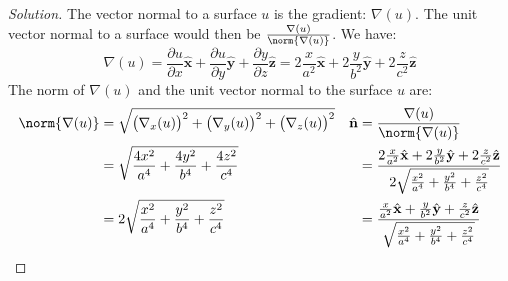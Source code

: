 \documentclass[crop=false,class=book,oneside]{standalone}
\begin{document}
            \begin{proof}[Solution]
                The vector normal to a surface $u$
                is the gradient: $\nabla(u)$.
                The unit vector normal to a surface would then be
                $\frac{\nabla(u)}{\norm{\nabla(u)}}$. We have:
                \begin{equation*}
                    \nabla(u)
                    =\frac{\partial u}{\partial x}\hat{\mathbf{x}}
                    +\frac{\partial u}{\partial y}\hat{\mathbf{y}}
                    +\frac{\partial y}{\partial z}\hat{\mathbf{z}}
                    =2\frac{x}{a^2}\hat{\mathbf{x}}
                    +2\frac{y}{b^2}\hat{\mathbf{y}}
                    +2\frac{z}{c^2}\hat{\mathbf{z}}
                \end{equation*}
                The norm of $\nabla(u)$ and the
                unit vector normal to the surface $u$ are:
                \begin{align*}
                    \norm{\nabla(u)}
                    &=
                    \sqrt{\big(\nabla_{x}(u)\big)^{2}
                    +\big(\nabla_{y}(u)\big)^{2}
                    +\big(\nabla_{z}(u)\big)^{2}}
                    &\hat{\mathbf{n}}
                    &=\frac{\nabla(u)}{\norm{\nabla(u)}}\\
                    &=
                    \sqrt{\frac{4x^{2}}{a^{4}}
                    +\frac{4y^{2}}{b^{4}}+\frac{4z^{2}}{c^{4}}}
                    &
                    &=\frac{2\frac{x}{a^{2}}\hat{\mathbf{x}}
                            +2\frac{y}{b^{2}}\hat{\mathbf{y}}
                            +2\frac{z}{c^{2}}\hat{\mathbf{z}}
                           }{
                                2\sqrt{\frac{x^{2}}{a^{4}}
                                +\frac{y^{2}}{b^{4}}
                                +\frac{z^{2}}{c^{4}}
                            }
                        }\\
                    &=
                    2\sqrt{\frac{x^{2}}{a^{4}}
                    +\frac{y^{2}}{b^{4}}
                    +\frac{z^{2}}{c^{4}}}
                    &
                    &=
                    \frac{
                          \frac{x}{a^{2}}\hat{\mathbf{x}}
                          +\frac{y}{b^{2}}\hat{\mathbf{y}}
                          +\frac{z}{c^{2}}\hat{\mathbf{z}}}
                         {
                            \sqrt{
                                \frac{x^{2}}{a^{4}}
                                +\frac{y^{2}}{b^{4}}
                                +\frac{z^{2}}{c^{4}}
                            }
                        }
                \end{align*}
            \end{proof}
\end{document}
